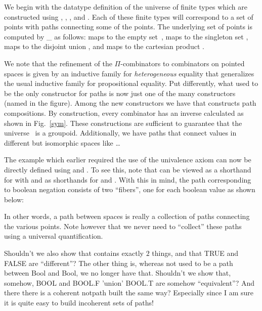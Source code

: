 We begin with the datatype definition of the universe  of finite
types which are constructed using ,
, , and
. Each of these finite types will correspond
to a set of points with paths connecting some of the points. The underlying
set of points is computed by \_ as follows:
 maps to the empty set~,
 maps to the singleton set ,
 maps to the disjoint union ,
and  maps to the cartesian product
.

We note that the refinement of the $\Pi$-combinators to combinators on
pointed spaces is given by an inductive family for
\emph{heterogeneous} equality that generalizes the usual inductive
family for propositional equality. Put differently, what used to be
the only constructor for paths  is now
just one of the many constructors (named
 in the figure). Among the new
constructors we have  that constructs path
compositions. By construction, every combinator has an inverse
calculated as shown in Fig.~\ref{sym}. These constructions are
sufficient to guarantee that the universe~ is a
groupoid. Additionally, we have paths that connect values in different
but isomorphic spaces like \ldots

The example  which earlier required the use of the
univalence axiom can now be directly defined using
 and . To
see this, note that  can be viewed as a shorthand for
 
 with  and
 as shorthands for
  and
 . With this in
mind, the path corresponding to boolean negation consists of two ``fibers'',
one for each boolean value as shown below:

\noindent In other words, a path between spaces is really a collection of
paths connecting the various points. Note however that we never need to
``collect'' these paths using a universal quantification.

Shouldn't we also show that  contains exactly
$2$ things, and that TRUE and FALSE are ``different''? The other thing
is, whereas not used to be a path between Bool and Bool, we no longer
have that.  Shouldn't we show that, somehow, BOOL and BOOL.F 'union'
BOOL.T are somehow ``equivalent''?  And there there is a coherent
notpath built the same way?  Especially since I am sure it is quite
easy to build incoherent sets of paths!


